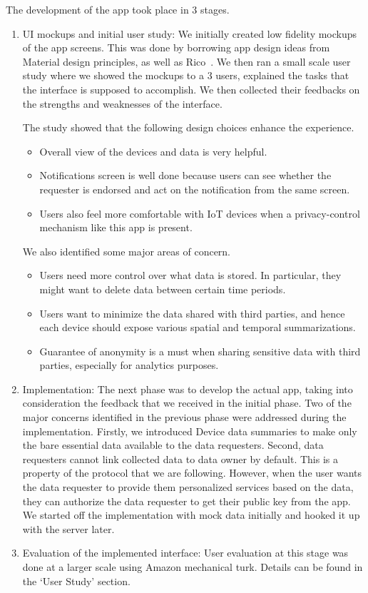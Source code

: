 The development of the app took place in 3 stages.
\begin{enumerate}
	\item UI mockups and initial user study: We initially created low fidelity mockups of the app screens. This was done by borrowing app design ideas from Material design principles, as well as Rico~\cite{rico}. We then ran a small scale user study where we showed the mockups to a 3 users, explained the tasks that the interface is supposed to accomplish. We then collected their feedbacks on the strengths and weaknesses of the interface.

	The study showed that the following design choices enhance the experience.

	\begin{itemize}
		\item Overall view of the devices and data is very helpful.
		\item Notifications screen is well done because users can see whether the requester is endorsed and act on the notification from the same screen.
		\item Users also feel more comfortable with IoT devices when a privacy-control mechanism like this app is present.
	\end{itemize}

	We also identified some major areas of concern.

	\begin{itemize}
		\item Users need more control over what data is stored. In particular, they might want to delete data between certain time periods.
		\item Users want to minimize the data shared with third parties, and hence each device should expose various spatial and temporal summarizations. 
		\item Guarantee of anonymity is a must when sharing sensitive data with third parties, especially for analytics purposes.
	\end{itemize}

	\item Implementation: The next phase was to develop the actual app, taking into consideration the feedback that we received in the initial phase. Two of the major concerns identified in the previous phase were addressed during the implementation. Firstly, we introduced Device data summaries to make only the bare essential data available to the data requesters. Second, data requesters cannot link collected data to data owner by default. This is a property of the protocol that we are following. However, when the user wants the data requester to provide them personalized services based on the data, they can authorize the data requester to get their public key from the app. We started off the implementation with mock data initially and hooked it up with the server later.

	\item Evaluation of the implemented interface: User evaluation at this stage was done at a larger scale using Amazon mechanical turk. Details can be found in the `User Study' section.
\end{enumerate}
